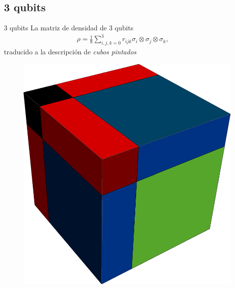 \documentclass[11pt,xcolor=dvipsnames]{beamer}
\begin{document}
\subsection{3 qubits}
\begin{frame}{3 qubits}
	La matriz de densidad de 3 qubits
	\begin{align*}
		\rho = \frac{1}{8} \sum _{i,j,k=0}^3 r_{ijk} \sigma _i \otimes \sigma _j
		\otimes \sigma _k, \hspace{15pt}
	\end{align*}\pause
	traducido a la descripción de \textit{cubos pintados}
	\begin{figure}
		\includegraphics[height=0.4\textheight]{img-congreso/rho-3q}
	\end{figure}
	
\end{frame}
\end{document}
